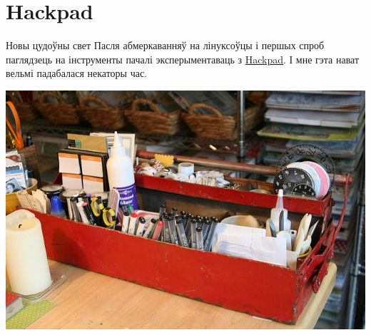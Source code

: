 \documentclass[ignorenonframetext,hyperref={pdftex,unicode}]{beamer}
\begin{document}
\section{Hackpad}
\begin{frame}{Новы цудоўны свет}
	Пасля абмеркаванняў на лінуксоўцы і першых спроб паглядзець на інструменты пачалі эксперыментаваць з \href{https://hackpad.com/}{Hackpad}. І мне гэта нават вельмі падабалася некаторы час. 
	\begin{center}
		\includegraphics[height=0.5\textheight,keepaspectratio]{502240730_b00feb15b0_z}
	\end{center}
\end{frame}
\end{document}
